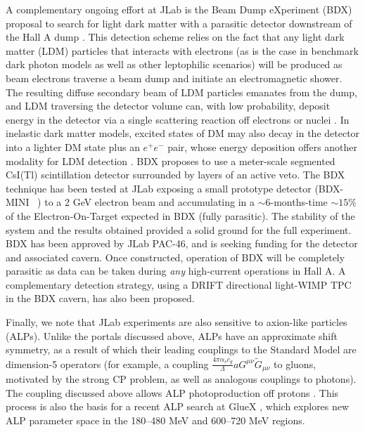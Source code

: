 A complementary ongoing effort at JLab is the Beam Dump eXperiment (BDX) proposal to search for light dark matter with a parasitic detector downstream of the Hall A dump \cite{Battaglieri:2014qoa,Battaglieri:2016ggd,Battaglieri:2017qen,Battaglieri:2019nok}.  This detection scheme relies on the fact that any light dark matter (LDM) particles that interacts with electrons (as is the case in benchmark dark photon models as well as other leptophilic scenarios) will be produced as beam electrons traverse a beam dump and initiate an electromagnetic shower.  The resulting diffuse secondary beam of LDM particles emanates from the dump, and LDM traversing the detector volume can, with low probability, deposit energy in the detector via a single scattering reaction off electrons or nuclei \cite{Izaguirre:2013uxa}.  In inelastic dark matter models, excited states of DM may also decay in the detector into a lighter DM state plus an $e^+e^-$ pair, whose energy deposition offers another modality for LDM detection \cite{Izaguirre:2014dua}.  BDX proposes to use a meter-scale segmented CsI(Tl) scintillation detector surrounded by layers of an active veto. The BDX technique has been tested at JLab exposing a small prototype detector (BDX-MINI ~\cite{Battaglieri:2020lds}) to a 2 GeV electron beam and accumulating in a $\sim$6-months-time $\sim 15\%$ of the Electron-On-Target expected in BDX (fully parasitic). The stability of the system and the results obtained provided a solid ground for the full  experiment. 
BDX has been approved by JLab PAC-46, and is seeking funding for the detector and associated cavern.  Once constructed, operation of BDX will be completely parasitic as data can be taken during \emph{any} high-current operations in Hall A.  A complementary detection strategy, using a DRIFT directional light-WIMP TPC \cite{Snowden-Ifft:2018bde} in the BDX cavern, has also been proposed.  

Finally, we note that JLab experiments are also sensitive to axion-like particles (ALPs).  Unlike the portals discussed above, ALPs have an approximate shift symmetry, as a result of which their leading couplings to the Standard Model are dimension-5 operators (for example, a coupling $\frac{4\pi \alpha_s c_g}{\Lambda}a G^{\mu\nu} \tilde G_{\mu\nu}$ to gluons, motivated by the strong CP problem, as well as analogous couplings to photons).  The coupling discussed above allows ALP photoproduction off protons \cite{Aloni:2019ruo}.  This process is also the basis for a recent ALP search at GlueX \cite{GlueX:2021myx}, which explores new ALP parameter space in the 180--480 MeV and 600--720 MeV regions.  

